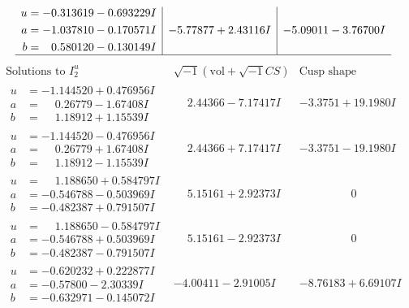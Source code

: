 \documentclass[1p]{elsarticle_modified}
\theoremstyle{definition}
\newcommand{\I}{\sqrt{-1}}
\begin{document}
$$\begin{array}{c|c|c}
\begin{aligned}
u &= -0.313619 - 0.693229 I \\
a &= -1.037810 - 0.170571 I \\
b &= \phantom{-}0.580120 - 0.130149 I\end{aligned}
 & -5.77877 + 2.43116 I & -5.09011 - 3.76700 I\\
 \hline 
 \end{array}$$\newpage$$\begin{array}{c|c|c}  
\text{Solutions to }I^u_{2}& \I (\text{vol} + \sqrt{-1}CS) & \text{Cusp shape}\\
 \hline 
\begin{aligned}
u &= -1.144520 + 0.476956 I \\
a &= \phantom{-}0.26779 - 1.67408 I \\
b &= \phantom{-}1.18912 + 1.15539 I\end{aligned}
 & \phantom{-}2.44366 - 7.17417 I & -3.3751 + 19.1980 I \\ \hline\begin{aligned}
u &= -1.144520 - 0.476956 I \\
a &= \phantom{-}0.26779 + 1.67408 I \\
b &= \phantom{-}1.18912 - 1.15539 I\end{aligned}
 & \phantom{-}2.44366 + 7.17417 I & -3.3751 - 19.1980 I \\ \hline\begin{aligned}
u &= \phantom{-}1.188650 + 0.584797 I \\
a &= -0.546788 - 0.503969 I \\
b &= -0.482387 + 0.791507 I\end{aligned}
 & \phantom{-}5.15161 + 2.92373 I & \phantom{-0.000000 } 0 \\ \hline\begin{aligned}
u &= \phantom{-}1.188650 - 0.584797 I \\
a &= -0.546788 + 0.503969 I \\
b &= -0.482387 - 0.791507 I\end{aligned}
 & \phantom{-}5.15161 - 2.92373 I & \phantom{-0.000000 } 0 \\ \hline\begin{aligned}
u &= -0.620232 + 0.222877 I \\
a &= -0.57800 - 2.30339 I \\
b &= -0.632971 - 0.145072 I\end{aligned}
 & -4.00411 - 2.91005 I & -8.76183 + 6.69107 I \\ \hline\begin{aligned}

\end{aligned}
\end{array}$$
\end{document}
